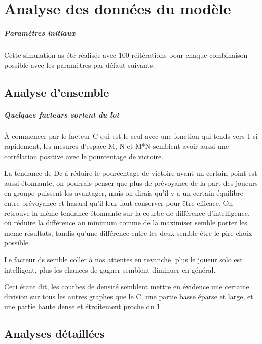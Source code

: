 \chapter{Analyse des données du modèle}

\paragraph{Paramètres initiaux}
Cette simulation as été réalisée avec 100 réitérations pour chaque combinaison possible avec les paramètres par défaut suivants.


\section{Analyse d'ensemble}


\paragraph{Quelques facteurs sortent du lot}
À commencer par le facteur C qui est le seul avec une fonction qui tends vers 1 si rapidement, les mesures d'espace M, N et M*N semblent avoir aussi une corrélation positive avec le pourcentage de victoire.

La tendance de Dc à réduire le pourcentage de victoire avant un certain point est aussi étonnante, on pourrais penser que plus de prévoyance de la part des joueurs en groupe puissent les avantager, mais on dirais qu'il y a un certain équilibre entre prévoyance et hasard qu'il leur faut conserver pour être efficace. 
On retrouve la même tendance étonnante sur la courbe de différence d'intelligence, où réduire la différence au minimum comme de la maximiser semble porter les meme résultats, tandis qu'une différence entre les deux semble être le pire choix possible.


Le facteur ds semble coller à nos attentes en revanche, plus le joueur solo est intelligent, plus les chances de gagner semblent diminuer en général.

Ceci étant dit, les courbes de densité semblent mettre en évidence une certaine division sur tous les autres graphes que le C, une partie basse éparse et large, et une partie haute dense et étroitement proche du 1.



\section{Analyses détaillées}
